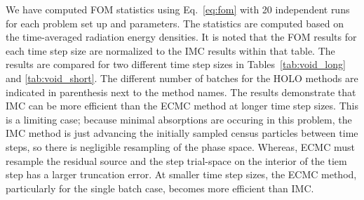 We have computed FOM statistics using Eq.~\eqref{eq:fom} with 20 independent runs for each
problem set up and parameters.  The statistics are computed based on the time-averaged
radiation energy densities.  
It is noted that the FOM results for each time step size are normalized to the IMC results within
that table.  
The results are compared for two different time step sizes 
in Tables~\ref{tab:void_long} and \ref{tab:void_short}.   The different number of batches for the HOLO methods are
indicated in parenthesis next to the method names.  The results demonstrate that IMC can
be more efficient than the ECMC method at longer time step sizes.  This is a limiting case; because minimal absorptions are
occuring in this problem, the IMC method is just advancing the initially sampled census particles
between time steps, so there is negligible resampling of the phase space.  Whereas, ECMC
must resample the residual source and the step trial-space on the interior of the tiem
step has a larger truncation error. At smaller time step sizes,
the ECMC method, particularly for the single batch case, becomes more efficient than IMC.
%


